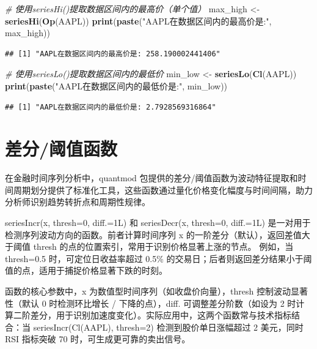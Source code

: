 \documentclass[]{ctexbook}
\newenvironment{Shaded}{\begin{snugshade}}{\end{snugshade}}
\newcommand{\CommentTok}[1]{\textcolor[rgb]{0.56,0.35,0.01}{\textit{#1}}}
\newcommand{\FunctionTok}[1]{\textcolor[rgb]{0.13,0.29,0.53}{\textbf{#1}}}
\newcommand{\NormalTok}[1]{#1}
\newcommand{\OtherTok}[1]{\textcolor[rgb]{0.56,0.35,0.01}{#1}}
\newcommand{\StringTok}[1]{\textcolor[rgb]{0.31,0.60,0.02}{#1}}
\begin{document}
\begin{Shaded}
\begin{Highlighting}[]
\CommentTok{\# 使用seriesHi()提取数据区间内的最高价（单个值）}
\NormalTok{max\_high }\OtherTok{\textless{}{-}} \FunctionTok{seriesHi}\NormalTok{(}\FunctionTok{Op}\NormalTok{(AAPL))}
\FunctionTok{print}\NormalTok{(}\FunctionTok{paste}\NormalTok{(}\StringTok{"AAPL在数据区间内的最高价是:"}\NormalTok{, max\_high))}
\end{Highlighting}
\end{Shaded}

\begin{verbatim}
## [1] "AAPL在数据区间内的最高价是: 258.190002441406"
\end{verbatim}

\begin{Shaded}
\begin{Highlighting}[]
\CommentTok{\# 使用seriesLo()提取数据区间内的最低价}
\NormalTok{min\_low }\OtherTok{\textless{}{-}} \FunctionTok{seriesLo}\NormalTok{(}\FunctionTok{Cl}\NormalTok{(AAPL))}
\FunctionTok{print}\NormalTok{(}\FunctionTok{paste}\NormalTok{(}\StringTok{"AAPL在数据区间内的最低价是:"}\NormalTok{, min\_low))}
\end{Highlighting}
\end{Shaded}

\begin{verbatim}
## [1] "AAPL在数据区间内的最低价是: 2.7928569316864"
\end{verbatim}

\section{差分/阈值函数}\label{ux5deeux5206ux9608ux503cux51fdux6570}

在金融时间序列分析中，quantmod 包提供的差分/阈值函数为波动特征提取和时间周期划分提供了标准化工具，这些函数通过量化价格变化幅度与时间间隔，助力分析师识别趋势转折点和周期性规律。

seriesIncr(x, thresh=0, diff.=1L) 和 seriesDecr(x, thresh=0, diff.=1L) 是一对用于检测序列波动方向的函数。前者计算时间序列 x 的一阶差分（默认），返回差值大于阈值 thresh 的点的位置索引，常用于识别价格显著上涨的节点。 例如，当 thresh=0.5 时，可定位日收益率超过 0.5\% 的交易日；后者则返回差分结果小于阈值的点，适用于捕捉价格显著下跌的时刻。

函数的核心参数中，x 为数值型时间序列（如收盘价向量），thresh 控制波动显著性（默认 0 时检测环比增长 / 下降的点），diff. 可调整差分阶数（如设为 2 时计算二阶差分，用于识别加速度变化）。实际应用中，这两个函数常与技术指标结合：当 seriesIncr(Cl(AAPL), thresh=2) 检测到股价单日涨幅超过 2 美元，同时 RSI 指标突破 70 时，可生成更可靠的卖出信号。
\end{document}
